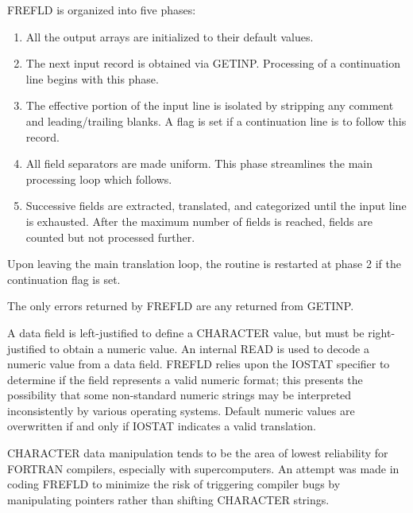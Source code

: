 FREFLD is organized into five phases:
\begin{enumerate}
\item All the output arrays are initialized to their default values.

\item The next input record is obtained via GETINP.  Processing of a
        continuation line begins with this phase.

\item The effective portion of the input line is isolated by stripping any
        comment and leading/trailing blanks.  A flag is set if a
        continuation line is to follow this record.

\item All field separators are made uniform.  This phase streamlines the
        main processing loop which follows.

\item Successive fields are extracted, translated, and categorized until
        the input line is exhausted.  After the maximum number of fields is
        reached, fields are counted but not processed further.
\end{enumerate}
Upon leaving the main translation loop, the routine is restarted at phase 2
if the continuation flag is set.

The only errors returned by FREFLD are any returned from GETINP.

A data field is left-justified to define a CHARACTER value, but must be
right-justified to obtain a numeric value.  An internal READ is used to
decode a numeric value from a data field.  FREFLD relies upon the IOSTAT
specifier to determine if the field represents a valid numeric format; this
presents the possibility that some non-standard numeric strings may be
interpreted inconsistently by various operating systems.  Default numeric
values are overwritten if and only if IOSTAT indicates a valid translation.

CHARACTER data manipulation tends to be the area of lowest reliability for
FORTRAN compilers, especially with supercomputers.  An attempt was made in
coding FREFLD to minimize the risk of triggering compiler bugs by
manipulating pointers rather than shifting CHARACTER strings.


